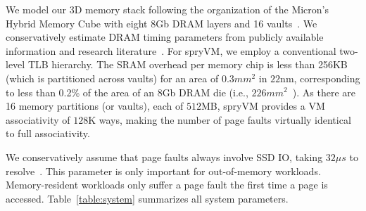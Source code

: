 We model our 3D memory stack following the organization of the Micron's Hybrid Memory Cube with eight $8$Gb DRAM layers and 16 vaults~\cite{micron:hmc}. We conservatively estimate DRAM timing parameters from publicly available information and research literature~\cite{gao:practical}. For spryVM, we employ a conventional two-level TLB hierarchy. The SRAM overhead per memory chip is less than 256KB (which is partitioned across vaults) for an area of $0.3mm^2$ in $22$nm, corresponding to less than 0.2\% of the area of an $8$Gb DRAM die (i.e., $226mm^2$~\cite{shevgoor:quantifying}). As there are 16 memory partitions (or vaults), each of $512$MB, spryVM provides a VM associativity of $128$K ways, making the number of page faults virtually identical to full associativity.

We conservatively assume that page faults always involve SSD IO, taking $32\mu{}s$ to resolve~\cite{chou:cameo}. This parameter is only important for out-of-memory workloads. Memory-resident workloads only suffer a page fault the first time a page is accessed. Table~\ref{table:system} summarizes all system parameters.

